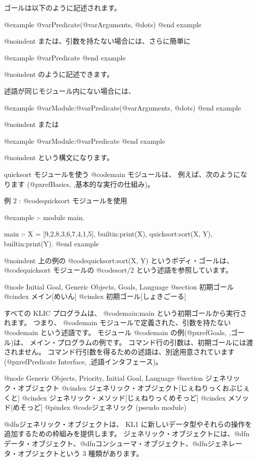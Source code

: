 ゴールは以下のように記述されます。

@example
@var{Predicate}(@var{Arguments}, @dots{})
@end example

@noindent
または、引数を持たない場合には、さらに簡単に

@example
@var{Predicate}
@end example

@noindent
のように記述できます。

述語が同じモジュール内にない場合には、

@example
@var{Module}:@var{Predicate}(@var{Arguments}, @dots{})
@end example

@noindent
または

@example
@var{Module}:@var{Predicate}
@end example

@noindent
という構文になります。

quicksort モジュールを使う @code{main} モジュールは、
例えば、次のようになります
(@pxref{Basics, ,基本的な実行の仕組み})。

例 2 : @code{quicksort} モジュールを使用

@example
:- module main.

main :-
    X = [9,2,8,3,6,7,4,1,5],
    builtin:print(X),
    quicksort:sort(X, Y),
    builtin:print(Y).
@end example

@noindent
上の例の @code{quicksort:sort(X, Y)} というボディ・ゴールは、 @code{quicksort} モジュールの @code{sort/2} という述語を参照しています。

@node Initial Goal, Generic Objects, Goals, Language
@section 初期ゴール
@cindex メイン[めいん]
@cindex 初期ゴール[しょきごーる]

すべての KLIC プログラムは、 @code{main:main} という初期ゴールから実行されます。
つまり、 @code{main} モジュールで定義された、引数を持たない @code{main} という述語です。
モジュール @code{main} の例(@pxref{Goals, ,ゴール})は、
メイン・プログラムの例です。
コマンド行の引数は、初期ゴールには渡されません。
コマンド行引数を得るための述語は、別途用意されています
(@pxref{Predicate Interface, ,述語インタフェース})。

@node Generic Objects, Priority, Initial Goal, Language
@section ジェネリック・オブジェクト
@cindex ジェネリック・オブジェクト[じぇねりっくおぶじぇくと]
@cindex ジェネリック・メソッド[じぇねりっくめそっど]
@cindex メソッド[めそっど]
@pindex @code{ジェネリック} (pseudo module)

@dfn{ジェネリック・オブジェクト}は、 KL1 に新しいデータ型やそれらの操作を追加するための枠組みを提供します。
ジェネリック・オブジェクトには、@dfn{データ・オブジェクト}、@dfn{コンシューマ・オブジェクト}、@dfn{ジェネレータ・オブジェクト}という 3 種類があります。

